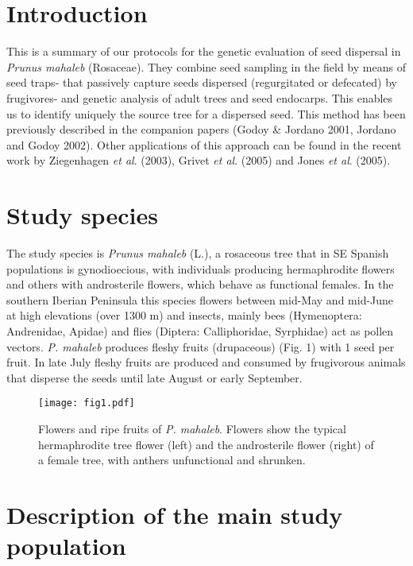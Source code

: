\documentclass[a4paper,12pt]{article}
\begin{document}
\section{Introduction}

This is a summary of our protocols for the genetic evaluation of seed dispersal in \textit{Prunus mahaleb} (Rosaceae). They combine seed sampling in the field by means of seed traps- that passively capture seeds dispersed (regurgitated or defecated) by frugivores- and genetic analysis of adult trees and seed endocarps. This enables us to identify uniquely the source tree for a dispersed seed. This method has been previously described in the companion papers (Godoy \& Jordano 2001, Jordano and Godoy 2002). Other applications of this approach can be found in the recent work by Ziegenhagen \textit{et al}. (2003), Grivet \textit{et al}. (2005) and Jones \textit{et al}. (2005).

\section{Study species}

The study species is \textit{Prunus mahaleb} (L.), a rosaceous tree that in SE Spanish populations is gynodioecious, with individuals producing hermaphrodite flowers and others with androsterile flowers, which behave as functional females. In the southern Iberian Peninsula this species flowers between mid-May and mid-June at high elevations (over 1300 m) and insects, mainly bees (Hymenoptera: Andrenidae, Apidae) and flies (Diptera: Calliphoridae, Syrphidae) act as pollen vectors. \textit{P. mahaleb} produces fleshy fruits (drupaceous) (Fig. 1) with 1 seed per fruit. In late July fleshy fruits are produced and consumed by frugivorous animals that disperse the seeds until late August or early September.

\begin{figure}[htbp]
\centerline{\texttt{[image: fig1.pdf]}}
%
\caption{Flowers and ripe fruits of \textit{P. mahaleb}. Flowers show the typical hermaphrodite tree flower (left) and the androsterile flower (right) of a female tree, with anthers unfunctional and shrunken.}\end{figure}


\section{Description of the main study population}
\end{document}
